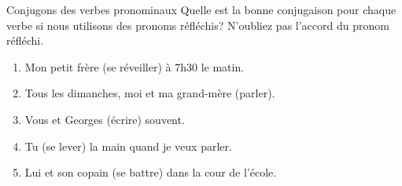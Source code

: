 \begin{frame}{Conjugons des verbes pronominaux}
  Quelle est la bonne conjugaison pour chaque verbe si nous utilisons des pronoms réfléchis?
  N'oubliez pas l'accord du pronom réfléchi.
  \begin{enumerate}
    \item Mon petit frère \underline{} (se réveiller) à 7h30 le matin.
    \item Tous les dimanches, moi et ma grand-mère \underline{} (parler).
    \item Vous et Georges \underline{} (écrire) souvent.
    \item Tu \underline{} (se lever) la main quand je veux parler.
    \item Lui et son copain \underline{} (se battre) dans la cour de l'école.
  \end{enumerate}
\end{frame}